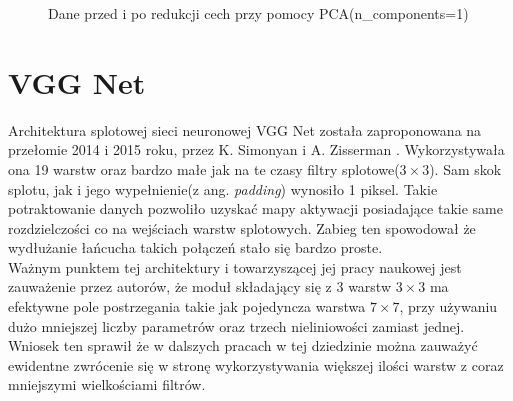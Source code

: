 \begin{figure}[h!]
	\centering
	\qquad
	\caption{Dane przed i po redukcji cech przy pomocy PCA(n\_components=1)}
	\label{fig:pca}
\end{figure}

\section{VGG Net}

Architektura splotowej sieci neuronowej VGG Net została zaproponowana na przełomie 2014 i 2015 roku, przez K.  Simonyan i A. Zisserman \cite{vgg}. Wykorzystywała ona 19 warstw oraz bardzo małe jak na te czasy filtry splotowe($3 \times 3$). Sam skok splotu, jak i jego wypełnienie(z ang. \textit{padding}) wynosiło 1 piksel. Takie potraktowanie danych pozwoliło uzyskać mapy aktywacji posiadające takie same rozdzielczości co na wejściach warstw splotowych. Zabieg ten spowodował że wydłużanie łańcucha takich połączeń stało się bardzo proste. \\

Ważnym punktem tej architektury i towarzyszącej jej pracy naukowej \cite{vgg} jest zauważenie przez autorów, że moduł składający się z 3 warstw $3 \times 3$ ma efektywne pole postrzegania takie jak pojedyncza warstwa $7 \times 7$, przy używaniu dużo mniejszej liczby parametrów oraz trzech nieliniowości zamiast jednej. Wniosek ten sprawił że w dalszych pracach w tej dziedzinie można zauważyć ewidentne zwrócenie się w stronę wykorzystywania większej ilości warstw z coraz mniejszymi wielkościami filtrów.
